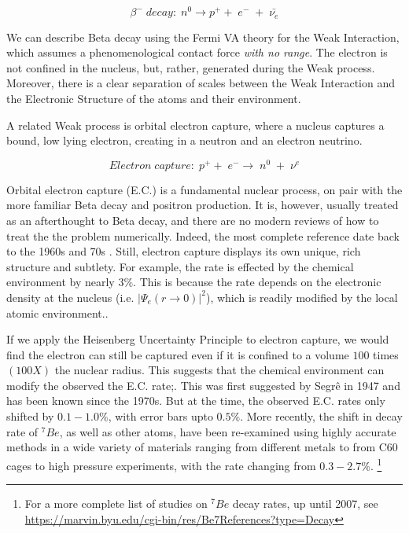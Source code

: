 \documentclass[%
 aip,
 jmp,%
 amsmath,amssymb,
 reprint,%
]{revtex4-1}
\begin{document}
$$\beta^{-}\;decay:\;n^{0}\rightarrow p^{+}+\;e^{-}\;+\;\bar{\nu_{e}}$$

We can describe Beta decay using the Fermi VA theory for the Weak Interaction, which assumes a phenomenological contact force \emph{with no range}.
The electron is not confined in the nucleus, but, rather, generated during the Weak process.  Moreover, there is a clear separation of scales between the Weak Interaction and the Electronic Structure of the atoms and their environment.

A related Weak process is orbital electron capture, where a nucleus captures a bound, low lying electron, creating in a neutron and an electron neutrino.

$$Electron\;capture:\;p^{+}+\;e^{-}\rightarrow\;n^{0}\;+\;\nu^{e}$$

Orbital electron capture (E.C.) is a fundamental  nuclear process, on pair with the more familiar Beta decay and positron production. It is, however, usually treated as an afterthought to Beta decay, and there are no modern reviews of how to treat the the problem numerically.  Indeed, the most complete reference date back to the 1960s and 70s \cite{ec-review1,ec-review2}.  Still, electron capture displays its own unique, rich structure and subtlety.  For example, the rate is effected by the chemical environment by nearly $3\%$. This is because the rate depends on the electronic density at the nucleus (i.e. $\vert\Psi_{e}(r\rightarrow 0)\vert^{2}$), which is readily modified by the local atomic environment.. 

If we apply the Heisenberg Uncertainty Principle to electron capture, we would find the electron can still be captured even if it is confined to a volume $100$ times $(100X)$ the nuclear radius.    This suggests that the chemical environment can modify the observed the E.C. rate;.  This was first suggested by Segr\^{e} in 1947\cite{Segre021947} and has been known since the 1970s\cite{emery}. But at the time, the observed E.C. rates only shifted by $0.1-1.0\%$, with error bars upto $0.5\%$\cite{1999EPSL171325H}.    More recently, the shift in decay rate of $^{7}Be$, as well as other atoms, have been re-examined using highly accurate methods in a wide variety of materials ranging from different metals to from C60 cages to high pressure experiments, with the rate changing from $0.3-2.7\%$.  \cite{RAY2009106, PhysRevC.101.035801,ohtsuki}\footnote{For a more complete list of studies on $^{7}Be$ decay rates, up until 2007, see \url{https://marvin.byu.edu/cgi-bin/res/Be7References?type=Decay} }
\end{document}
